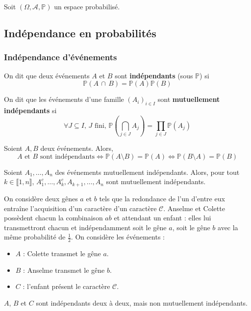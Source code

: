 




	Soit $(\Omega, \mathcal{A}, \mathbb{P})$ un espace probabilisé.

	\subsection{Indépendance en probabilités}
	
	\subsubsection{Indépendance d'événements}
	
	
	\begin{definition}
		On dit que deux événements $A$ et $B$ sont \textbf{indépendants} (sous $\mathbb{P}$) si
		\[ \mathbb{P}(A \, \cap \, B) = \mathbb{P}(A) \mathbb{P}(B) \]
	\end{definition}
	
	\begin{definition}
		On dit que les événements d'une famille $(A_i)_{i \in I}$ sont \textbf{mutuellement indépendants} si
		\[ \forall J \subseteq I, \, J \text{ fini}, \, \mathbb{P}\left( \bigcap_{j \in J} A_j \right) = \prod_{j \in J} \mathbb{P}(A_j) \] 
	\end{definition}
	
	
	\begin{proposition}
		Soient $A, B$ deux événements. Alors,
		\[ A \text{ et } B \text{ sont indépendants} \iff \mathbb{P}(A \setminus B) = \mathbb{P}(A) \iff \mathbb{P}(B \setminus A) = \mathbb{P}(B) \]
	\end{proposition}
	
	\begin{proposition}
		Soient $A_1, \dots, A_n$ des événements mutuellement indépendants. Alors, pour tout $k \in \llbracket 1, n \rrbracket$, $A_1^c, \dots, A_k^c, A_{k+1}, \dots, A_n$ sont mutuellement indépendants.
	\end{proposition}
	
	\begin{example}
		On considère deux gênes $a$ et $b$ tels que la redondance de l'un d'entre eux entraîne l'acquisition d'un caractère d'un caractère $\mathcal{C}$. Anselme et Colette possèdent chacun la combinaison $ab$ et attendant un enfant : elles lui transmettront chacun et indépendamment soit le gêne $a$, soit le gêne $b$ avec la même probabilité de $\frac{1}{2}$. On considère les événements :
		\begin{itemize}
			\item $A$ : Colette transmet le gêne $a$.
			\item $B$ : Anselme transmet le gêne $b$.
			\item $C$ : l'enfant présent le caractère $\mathcal{C}$.
		\end{itemize}
		$A$, $B$ et $C$ sont indépendants deux à deux, mais non mutuellement indépendants.
	\end{example}
	
